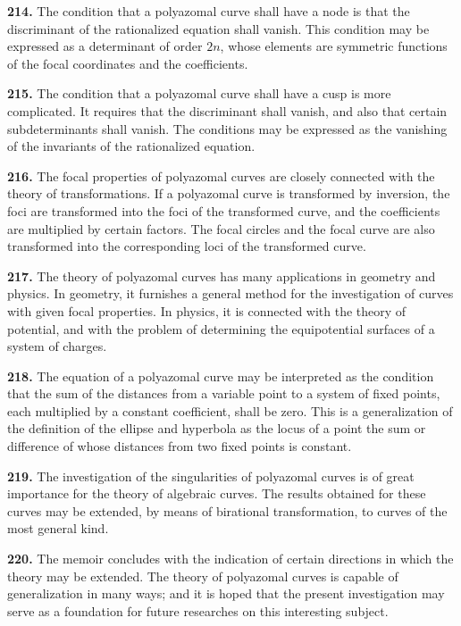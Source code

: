 \documentclass[12pt,a4paper]{article}
\theoremstyle{definition}
\begin{document}
\noindent\textbf{214.} The condition that a polyazomal curve shall have a node is that the
discriminant of the rationalized equation shall vanish. This condition may be expressed
as a determinant of order $2n$, whose elements are symmetric functions of the focal
coordinates and the coefficients.

\noindent\textbf{215.} The condition that a polyazomal curve shall have a cusp is more
complicated. It requires that the discriminant shall vanish, and also that certain
subdeterminants shall vanish. The conditions may be expressed as the vanishing of
the invariants of the rationalized equation.

\noindent\textbf{216.} The focal properties of polyazomal curves are closely connected with the
theory of transformations. If a polyazomal curve is transformed by inversion, the
foci are transformed into the foci of the transformed curve, and the coefficients are
multiplied by certain factors. The focal circles and the focal curve are also transformed
into the corresponding loci of the transformed curve.

\newpage
\noindent\textbf{217.} The theory of polyazomal curves has many applications in geometry
and physics. In geometry, it furnishes a general method for the investigation of curves
with given focal properties. In physics, it is connected with the theory of potential,
and with the problem of determining the equipotential surfaces of a system of charges.

\noindent\textbf{218.} The equation of a polyazomal curve may be interpreted as the condition
that the sum of the distances from a variable point to a system of fixed points, each
multiplied by a constant coefficient, shall be zero. This is a generalization of the
definition of the ellipse and hyperbola as the locus of a point the sum or difference
of whose distances from two fixed points is constant.

\noindent\textbf{219.} The investigation of the singularities of polyazomal curves is of great
importance for the theory of algebraic curves. The results obtained for these curves
may be extended, by means of birational transformation, to curves of the most general
kind.

\noindent\textbf{220.} The memoir concludes with the indication of certain directions in which
the theory may be extended. The theory of polyazomal curves is capable of generalization
in many ways; and it is hoped that the present investigation may serve as a
foundation for future researches on this interesting subject.
\end{document}
